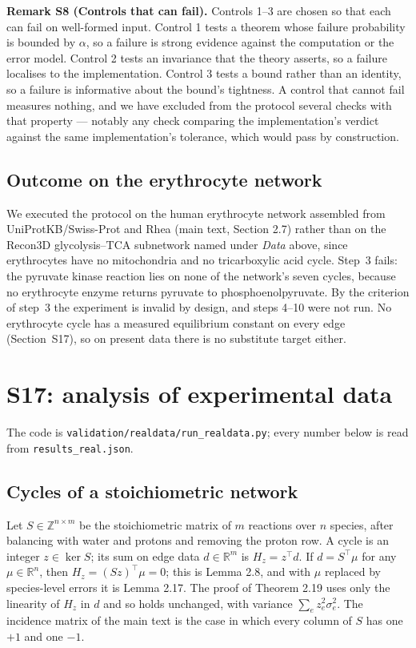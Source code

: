 \documentclass[11pt,a4paper]{article}
\theoremstyle{definition}
\theoremstyle{remark}
\newcommand{\hol}{H}
\begin{document}
\par\noindent\textbf{Remark S8 (Controls that can fail).}\label{rem:controls} 
Controls 1--3 are chosen so that each can fail on well-formed input.
Control 1 tests a theorem whose failure probability is bounded by
$\alpha$, so a failure is strong evidence against the computation or the
error model. Control 2 tests an invariance that the theory asserts, so
a failure localises to the implementation. Control 3 tests a bound
rather than an identity, so a failure is informative about the bound's
tightness. A control that cannot fail measures nothing, and we have
excluded from the protocol several checks with that property --- notably
any check comparing the implementation's verdict against the same
implementation's tolerance, which would pass by construction.
\par


\subsection*{Outcome on the erythrocyte network}

We executed the protocol on the human erythrocyte network assembled from
UniProtKB/Swiss-Prot \citep{uniprot2025} and Rhea \citep{bansal2022}
(main text, Section 2.7) rather than on the Recon3D glycolysis--TCA
subnetwork named under \emph{Data} above, since erythrocytes have no
mitochondria and no tricarboxylic acid cycle. Step~3 fails: the pyruvate
kinase reaction lies on none of the network's seven cycles, because no
erythrocyte enzyme returns pyruvate to phosphoenolpyruvate. By the
criterion of step~3 the experiment is invalid by design, and steps
4--10 were not run. No erythrocyte cycle has a measured equilibrium
constant on every edge (Section~S17), so on present data there is no
substitute target either.

\section*{S17: analysis of experimental data}

The code is \texttt{validation/realdata/run\_realdata.py}; every number
below is read from \texttt{results\_real.json}.

\subsection*{Cycles of a stoichiometric network}

Let $S\in\mathbb{Z}^{n\times m}$ be the stoichiometric matrix of $m$
reactions over $n$ species, after balancing with water and protons and
removing the proton row. A cycle is an integer $z\in\ker S$; its sum on
edge data $d\in\mathbb{R}^{m}$ is $\hol_z=z^{\top}d$. If
$d=S^{\top}\mu$ for any $\mu\in\mathbb{R}^{n}$, then
$\hol_z=(Sz)^{\top}\mu=0$; this is Lemma 2.8, and with $\mu$
replaced by species-level errors it is Lemma 2.17. The
proof of Theorem 2.19 uses only the linearity of $\hol_z$ in
$d$ and so holds unchanged, with variance $\sum_e z_e^{2}\sigma_e^{2}$.
The incidence matrix of the main text is the case in which every column
of $S$ has one $+1$ and one $-1$.
\end{document}
